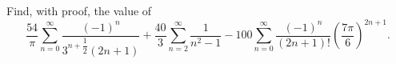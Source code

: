 Find, with proof, the value of
\[\dfrac{54}{\pi}\sum_{n=0}^{\infty}\dfrac{(-1)^n}{3^{n+\dfrac12}(2n+1)}+\dfrac{40}{3}\sum_{n=2}^{\infty}\dfrac{1}{n^2-1}-100\sum_{n=0}^{\infty}\dfrac{(-1)^n}{(2n+1)!}\left(\dfrac{7\pi}{6}\right)^{2n+1}.\]

